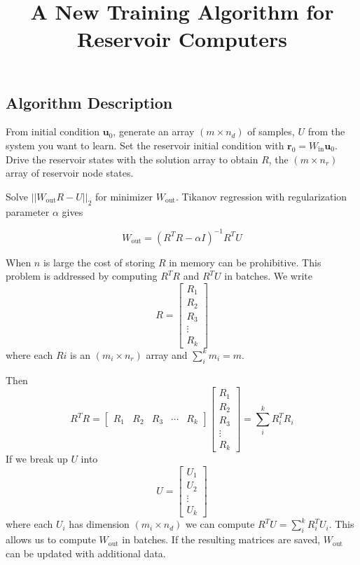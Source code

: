 \documentclass{article}
\begin{document}
\title{A New Training Algorithm for Reservoir Computers}
\maketitle

\subsection*{Algorithm Description}
From initial condition $\mathbf{u}_0$, generate an array $(m \times n_d)$ of samples, $U$ from the system you want to learn.
Set the reservoir initial condition with $\mathbf{r}_0=W_\text{in} \mathbf{u}_0$. Drive the reservoir states with the solution array to obtain $R$, the $(m \times n_r)$ array of reservoir node states.

Solve $||W_\text{out} R - U||_2$ for minimizer $W_\text{out}$. Tikanov regression with regularization parameter  $\alpha$ gives

\[
W_\text{out} = (R^TR - \alpha I)^{-1} R^T U
\]

When $n$ is large the cost of storing $R$ in memory can be prohibitive. This problem is addressed by computing $R^TR$ and $R^TU$ in batches. We write
\[
R = \begin{bmatrix}
R_1 \\
R_2\\
R_3 \\
\vdots  \\
R_k
\end{bmatrix}  
\]
where each $Ri$ is an $(m_i \times n_r)$ array and $\sum_i^k m_i = m$.

Then 
\[
R^TR = 
\begin{bmatrix}
R_1 &  R_2 & R_3 & \cdots & R_k
\end{bmatrix}  
\begin{bmatrix}
R_1 \\ 
R_2\\
R_3 \\
\vdots \\ 
R_k
\end{bmatrix}  = \sum_i^k R_i^T R_i
\]
If we break up $U$ into 
\[
U = 
\begin{bmatrix}
U_1 \\ U_2 \\  \vdots \\ U_k
\end{bmatrix} 
\]where each $U_i$ has dimension $(m_i \times n_d)$ we can compute $R^TU = \sum_i^k R_i^T U_i$. This allows us to compute $W_\text{out}$ in batches. If the resulting matrices are saved, $W_\text{out}$ can be updated with additional data.
\end{document}
